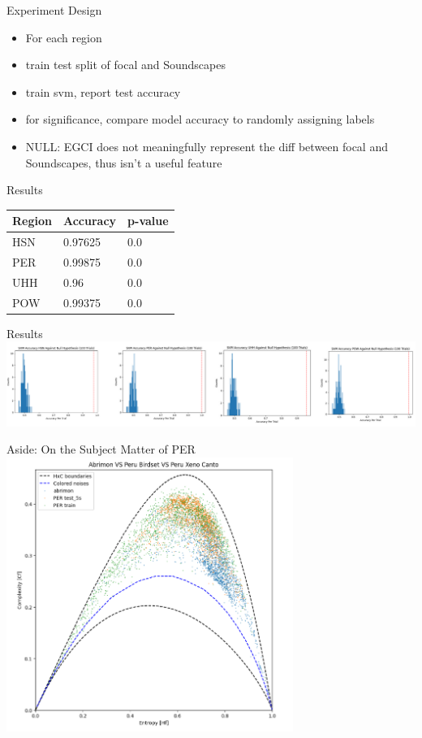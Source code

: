 \begin{frame}{Experiment Design}
    \begin{itemize}
        \item For each region
        \item train test split of focal and Soundscapes
        \item train svm, report test accuracy
        \item for significance, compare model accuracy to randomly assigning labels
        \item NULL: EGCI does not meaningfully represent the diff between focal and Soundscapes, thus isn't a useful feature
    \end{itemize}    
\end{frame}
\begin{frame}{Results}
    \begin{table}[]
        \begin{tabular}{l|ll}
        Region & Accuracy & p-value \\ \hline
        HSN    & 0.97625  & 0.0     \\
        PER    & 0.99875  & 0.0     \\
        UHH    & 0.96     & 0.0     \\
        POW    & 0.99375  & 0.0    
        \end{tabular}
    \end{table}  
\end{frame}
\begin{frame}{Results}
    \centering
    \includegraphics[height=2\textheight,width=1\textwidth,keepaspectratio]{images/Results.png} 
\end{frame}
\begin{frame}{Aside: On the Subject Matter of PER}
        \centering
        \includegraphics[height=0.7\textheight,width=0.7\textwidth,keepaspectratio]{images/AbrimonToo.png}  
\end{frame}
